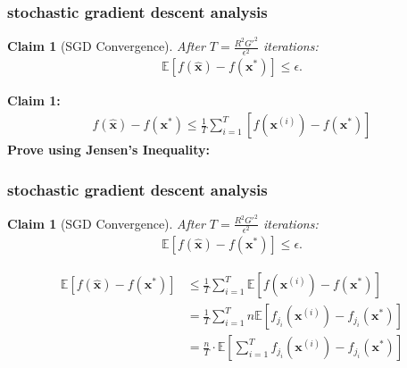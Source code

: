 \documentclass[compress]{beamer}
\newcommand{\bv}[1]{\mathbf{#1}}
\newcommand{\E}{\mathbb{E}}
\newtheorem{claim}[theorem]{Claim}
\begin{document}
\begin{frame}[t]
	\frametitle{stochastic gradient descent analysis}
	\begin{claim}[SGD Convergence]
		After $T = \frac{R^2G'^2}{\epsilon^2}$ iterations:
		\begin{align*}
			\E\left[f(\hat{\bv{x}}) - f(\bv{x}^*)\right] \leq \epsilon.
		\end{align*}

	\end{claim}
	\textbf{Claim 1:} 
	\begin{align*}
		f(\hat{\bv{x}}) - f(\bv{x}^*) \leq \frac{1}{T}\sum_{i=1}^T\left[f(\bv{x}^{(i)}) -f(\bv{x}^*)\right]
	\end{align*}
\textbf{Prove using Jensen's Inequality:}
\end{frame}

\begin{frame}[t]
	\frametitle{stochastic gradient descent analysis}
	\small
	\begin{claim}[SGD Convergence]
		After $T = \frac{R^2G'^2}{\epsilon^2}$ iterations:
		\vspace{-1em}
		\begin{align*}
			\E\left[f(\hat{\bv{x}}) - f(\bv{x}^*)\right] \leq \epsilon.
		\end{align*}
	
		\vspace{-1em}
	\end{claim}\vspace{-2em}
	\begin{align*}
		\E[f(\hat{\bv{x}}) - f(\bv{x}^*)] &\leq \frac{1}{T}\sum_{i=1}^T\E\left[f(\bv{x}^{(i)}) -f(\bv{x}^*)\right]
		\\
		&=\frac{1}{T}\sum_{i=1}^Tn\E\left[f_{j_i}(\bv{x}^{(i)}) -f_{j_i}(\bv{x}^*)\right]\\
		&=\frac{n}{T}\cdot \E \left[\sum_{i=1}^Tf_{j_i}(\bv{x}^{(i)}) -f_{j_i}(\bv{x}^*)\right]
	\end{align*}
\end{frame}
\end{document}
